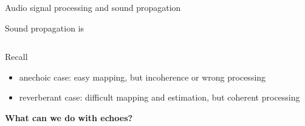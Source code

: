 \begin{frame}{Audio signal processing and sound propagation}
\begin{block}{Sound propagation is}
\begin{columns}[onlytextwidth]
        \end{columns}
    \end{block}


    \begin{block}{Recall}
        \begin{itemize}
            \item anechoic case: easy mapping, but incoherence or wrong processing
            \item reverberant case: difficult mapping and estimation, but coherent processing
        \end{itemize}
        \hfill \textcolor{myred}{\textbf{What can we do with echoes?}}
    \end{block}
\end{frame}

